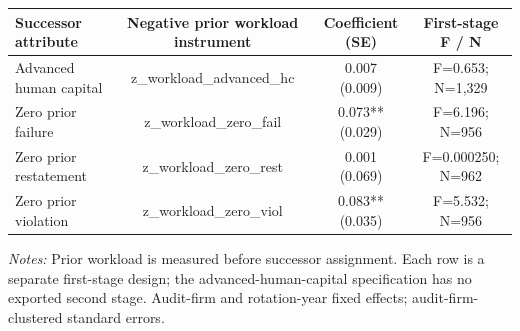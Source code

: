 \documentclass[10pt]{article}
\begin{document}
\begin{minipage}{20cm}\fontsize{10}{12}\selectfont\setlength{\tabcolsep}{4pt}\renewcommand{\arraystretch}{1.12}


\centering
{}
\begin{threeparttable}
\begin{tabular}{p{}ccc}
\toprule
Successor attribute & Negative prior workload instrument & Coefficient (SE) & First-stage F / N \\
\midrule
Advanced human capital & z\_workload\_advanced\_hc & \shortstack{0.007\\(0.009)} & F=0.653; N=1,329 \\
Zero prior failure & z\_workload\_zero\_fail & \shortstack{0.073**\\(0.029)} & F=6.196; N=956 \\
Zero prior restatement & z\_workload\_zero\_rest & \shortstack{0.001\\(0.069)} & F=0.000250; N=962 \\
Zero prior violation & z\_workload\_zero\_viol & \shortstack{0.083**\\(0.035)} & F=5.532; N=956 \\
\bottomrule
\end{tabular}
\begin{tablenotes}\fontsize{9}{11}\selectfont
\item \raggedright \fontsize{9}{11}\selectfont \textit{Notes:} Prior workload is measured before successor assignment. Each row is a separate first-stage design; the advanced-human-capital specification has no exported second stage. Audit-firm and rotation-year fixed effects; audit-firm-clustered standard errors.
\end{tablenotes}
\end{threeparttable}

\end{minipage}
\end{document}

